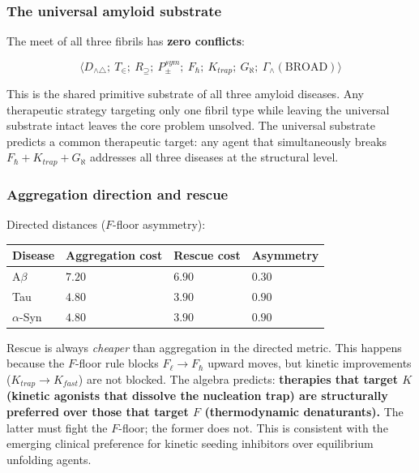 \documentclass[12pt,a4paper]{article}
\begin{document}
\subsubsection{The universal amyloid substrate}

The meet of all three fibrils has \textbf{zero conflicts}:

\[\langle D_{\wedge\triangle};\ T_\in;\ R_\supseteq;\ P_\pm^{sym};\ F_\hbar;\ K_{trap};\ G_\aleph;\ \Gamma_\wedge(\text{BROAD}) \rangle\]

This is the shared primitive substrate of all three amyloid diseases. Any therapeutic strategy targeting only one fibril type while leaving the universal substrate intact leaves the core problem unsolved. The universal substrate predicts a common therapeutic target: any agent that simultaneously breaks $F_\hbar + K_{trap} + G_\aleph$ addresses all three diseases at the structural level.

\subsubsection{Aggregation direction and rescue}

Directed distances ($F$-floor asymmetry):

\begin{table}[htbp]
\centering
\small
{}
\begin{tabularx}{\textwidth}{>{\centering\arraybackslash}X >{\centering\arraybackslash}X >{\centering\arraybackslash}X >{\centering\arraybackslash}X}
\toprule
\rowcolor{gray!25}\textbf{Disease} & \textbf{Aggregation cost} & \textbf{Rescue cost} & \textbf{Asymmetry} \\
\midrule
\rowcolors{1}{white}{gray!10}
A$\beta$ & $7.20$ & $6.90$ & $0.30$ \\
Tau & $4.80$ & $3.90$ & $0.90$ \\
$\alpha$-Syn & $4.80$ & $3.90$ & $0.90$ \\
\bottomrule
\end{tabularx}
\end{table}

Rescue is always \emph{cheaper} than aggregation in the directed metric. This happens because the $F$-floor rule blocks $F_\ell \to F_\hbar$ upward moves, but kinetic improvements ($K_{trap} \to K_{fast}$) are not blocked. The algebra predicts: \textbf{therapies that target $K$ (kinetic agonists that dissolve the nucleation trap) are structurally preferred over those that target $F$ (thermodynamic denaturants).} The latter must fight the $F$-floor; the former does not. This is consistent with the emerging clinical preference for kinetic seeding inhibitors over equilibrium unfolding agents.
\end{document}
